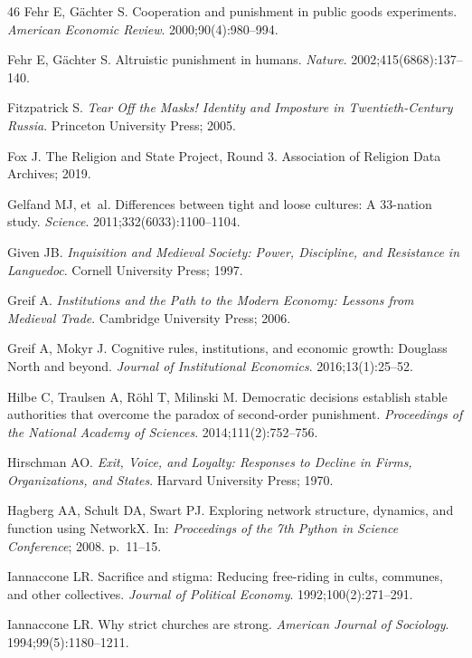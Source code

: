 \documentclass[12pt]{article}
\begin{document}
\begin{thebibliography}{46}
Fehr E, G\"{a}chter S.
Cooperation and punishment in public goods experiments.
\textit{American Economic Review}. 2000;90(4):980--994.

Fehr E, G\"{a}chter S.
Altruistic punishment in humans.
\textit{Nature}. 2002;415(6868):137--140.

Fitzpatrick S.
\textit{Tear Off the Masks! Identity and Imposture in Twentieth-Century Russia}.
Princeton University Press; 2005.

Fox J.
The Religion and State Project, Round 3.
Association of Religion Data Archives; 2019.

Gelfand MJ, et~al.
Differences between tight and loose cultures: A 33-nation study.
\textit{Science}. 2011;332(6033):1100--1104.

Given JB.
\textit{Inquisition and Medieval Society: Power, Discipline, and Resistance in Languedoc}.
Cornell University Press; 1997.

Greif A.
\textit{Institutions and the Path to the Modern Economy: Lessons from Medieval Trade}.
Cambridge University Press; 2006.

Greif A, Mokyr J.
Cognitive rules, institutions, and economic growth: Douglass North and beyond.
\textit{Journal of Institutional Economics}. 2016;13(1):25--52.

Hilbe C, Traulsen A, R\"{o}hl T, Milinski M.
Democratic decisions establish stable authorities that overcome the paradox of second-order punishment.
\textit{Proceedings of the National Academy of Sciences}. 2014;111(2):752--756.

Hirschman AO.
\textit{Exit, Voice, and Loyalty: Responses to Decline in Firms, Organizations, and States}.
Harvard University Press; 1970.

Hagberg AA, Schult DA, Swart PJ.
Exploring network structure, dynamics, and function using NetworkX.
In: \textit{Proceedings of the 7th Python in Science Conference}; 2008. p.~11--15.

Iannaccone LR.
Sacrifice and stigma: Reducing free-riding in cults, communes, and other collectives.
\textit{Journal of Political Economy}. 1992;100(2):271--291.

Iannaccone LR.
Why strict churches are strong.
\textit{American Journal of Sociology}. 1994;99(5):1180--1211.


\end{thebibliography}
\end{document}
